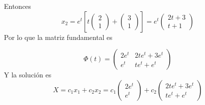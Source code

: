 Entonces
\begin{equation*}
    x_{2}= e^{t}\left[t 
    \begin{pmatrix}
    2\\
    1
    \end{pmatrix} + 
    \begin{pmatrix}
    3 \\
    1
    \end{pmatrix} \right]
    =
    e^{t}\begin{pmatrix}
    2t +3 \\
    t + 1
    \end{pmatrix}
\end{equation*}
Por lo que la matriz fundamental es 

\begin{equation*}
    \Phi(t)= \begin{pmatrix}
2e^{t} &  2te^{t}+ 3e^{t}\\
e^{t} & te^{t} + e^{t}
\end{pmatrix}
\end{equation*}
Y la solución es 
\begin{equation*}
    X=c_{1}x_{1} + c_{2}x_{2} = c_{1}\begin{pmatrix}
2e^{t} \\
e^{t}
\end{pmatrix} + c_{2}\begin{pmatrix}
2te^{t}+ 3e^{t}\\
te^{t} + e^{t}
\end{pmatrix}
\end{equation*}